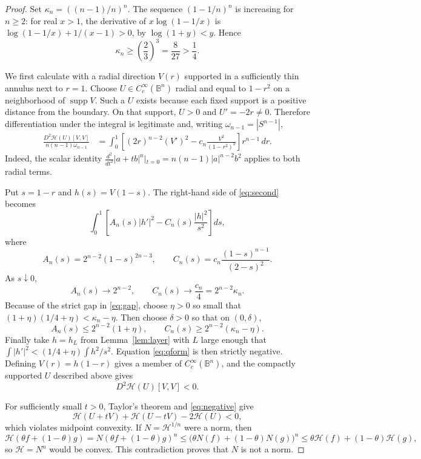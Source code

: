 \documentclass[11pt]{article}
\newcommand{\B}{\mathbb B}
\newcommand{\Cc}{C_c^\infty}
\newcommand{\HH}{\mathcal H}
\newcommand{\kap}{\kappa_n}
\begin{document}
\begin{proof}
Set $\kap=((n-1)/n)^n$.  The sequence $(1-1/n)^n$ is increasing for
$n\ge2$: for real $x>1$, the derivative of
$x\log(1-1/x)$ is $\log(1-1/x)+1/(x-1)>0$, by
$\log(1+y)<y$.  Hence
\begin{equation}\label{eq:gap}
 \kap\ge\left(\frac23\right)^3=\frac8{27}>\frac14.
\end{equation}

We first calculate with a radial direction $V(r)$ supported in a sufficiently
thin annulus next to $r=1$.  Choose $U\in\Cc(\B^n)$ radial and equal to
$1-r^2$ on a neighborhood of $\operatorname{supp}V$.  Such a $U$ exists
because each fixed support is a positive distance from the boundary.  On that
support, $U>0$ and $U'=-2r\ne0$.  Therefore differentiation under the integral
is legitimate and, writing $\omega_{n-1}=|S^{n-1}|$,
\begin{align}
 \frac{D^2\HH(U)[V,V]}{n(n-1)\omega_{n-1}}
 &=\int_0^1\left[(2r)^{n-2}(V')^2
 -c_n\frac{V^2}{(1-r^2)^2}\right]r^{n-1}\,dr.\label{eq:second}
\end{align}
Indeed, the scalar identity
$\frac{d^2}{dt^2}|a+tb|^n|_{t=0}=n(n-1)|a|^{n-2}b^2$
applies to both radial terms.

Put $s=1-r$ and $h(s)=V(1-s)$.  The right-hand side of
\eqref{eq:second} becomes
\begin{equation}\label{eq:qform}
 \int_0^1\left[A_n(s)|h'|^2-C_n(s)\frac{|h|^2}{s^2}\right]ds,
\end{equation}
where
\[
 A_n(s)=2^{n-2}(1-s)^{2n-3},\qquad
 C_n(s)=c_n\frac{(1-s)^{n-1}}{(2-s)^2}.
\]
As $s\downarrow0$,
\[
 A_n(s)\longrightarrow2^{n-2},\qquad
 C_n(s)\longrightarrow\frac{c_n}{4}=2^{n-2}\kap.
\]
Because of the strict gap in \eqref{eq:gap}, choose $\eta>0$ so small that
$(1+\eta)(1/4+\eta)<\kap-\eta$.  Then choose $\delta>0$ so that on
$(0,\delta)$,
\[
 A_n(s)\le2^{n-2}(1+\eta),\qquad
 C_n(s)\ge2^{n-2}(\kap-\eta).
\]
Finally take $h=h_L$ from Lemma~\ref{lem:layer} with $L$ large enough that
$\int|h'|^2<(1/4+\eta)\int h^2/s^2$.  Equation \eqref{eq:qform} is then
strictly negative.  Defining $V(r)=h(1-r)$ gives a member of
$\Cc(\B^n)$, and the compactly supported $U$ described above gives
\begin{equation}\label{eq:negative}
 D^2\HH(U)[V,V]<0.
\end{equation}

For sufficiently small $t>0$, Taylor's theorem and \eqref{eq:negative} give
\[
 \HH(U+tV)+\HH(U-tV)-2\HH(U)<0,
\]
which violates midpoint convexity.  If $N=\HH^{1/n}$ were a norm, then
\[
 \HH(\theta f+(1-\theta)g)=N(\theta f+(1-\theta)g)^n
 \le\bigl(\theta N(f)+(1-\theta)N(g)\bigr)^n
 \le\theta\HH(f)+(1-\theta)\HH(g),
\]
so $\HH=N^n$ would be convex.  This contradiction proves that $N$ is not a
norm.
\end{proof}
\end{document}
